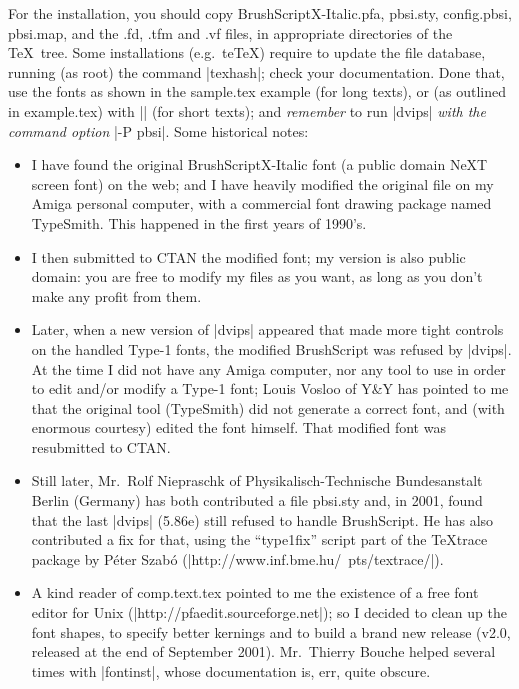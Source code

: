 \documentclass[a4paper]{article}
\begin{document}
For the installation, you should copy
BrushScriptX-Italic.pfa, pbsi.sty, config.pbsi, pbsi.map,
and the .fd, .tfm and .vf files, in appropriate directories
of the \TeX\ tree.  Some installations (e.g.\ teTeX) require
to update the file database, running (as root) the command
|texhash|; check your documentation.  Done that, use the
fonts as shown in the sample.tex example (for long texts),
or (as outlined in example.tex) with || (for
short texts); and \emph{remember} to run |dvips| \emph{with
  the command option} |-P pbsi|.  Some historical notes:
\begin{itemize}
\item I have found the original BrushScriptX-Italic font (a
  public domain NeXT screen font) on the web; and I have
  heavily modified the original file on my Amiga personal
  computer, with a commercial font drawing package named
  TypeSmith.  This happened in the first years of 1990's.
\item I then submitted to CTAN the modified font; my version
  is also public domain: you are free to modify my files as
  you want, as long as you don't make any profit from them.
\item Later, when a new version of |dvips| appeared that
  made more tight controls on the handled Type-1 fonts, the
  modified BrushScript was refused by |dvips|.  At the time
  I did not have any Amiga computer, nor any tool to use in
  order to edit and/or modify a Type-1 font; Louis Vosloo of
  Y\&Y has pointed to me that the original tool (TypeSmith)
  did not generate a correct font, and (with enormous
  courtesy) edited the font himself.  That modified font was
  resubmitted to CTAN.
\item Still later, Mr.\ Rolf Niepraschk of
  Physikalisch-Technische Bundesanstalt Berlin (Germany) has
  both contributed a file pbsi.sty and, in 2001, found that
  the last |dvips| (5.86e) still refused to handle
  BrushScript.  He has also contributed a fix for that,
  using the ``type1fix'' script part of the \TeX{}trace
  package by P\'eter Szab\'o
  (|http://www.inf.bme.hu/~pts/textrace/|).
\item A kind reader of comp.text.tex pointed to me the
  existence of a free font editor for Unix
  (|http://pfaedit.sourceforge.net|); so I decided to clean
  up the font shapes, to specify better kernings and to
  build a brand new release (v2.0, released at the end of
  September 2001).  Mr.\ Thierry Bouche helped several times
  with |fontinst|, whose documentation is, err, quite
  obscure.
\end{itemize}
\end{document}
